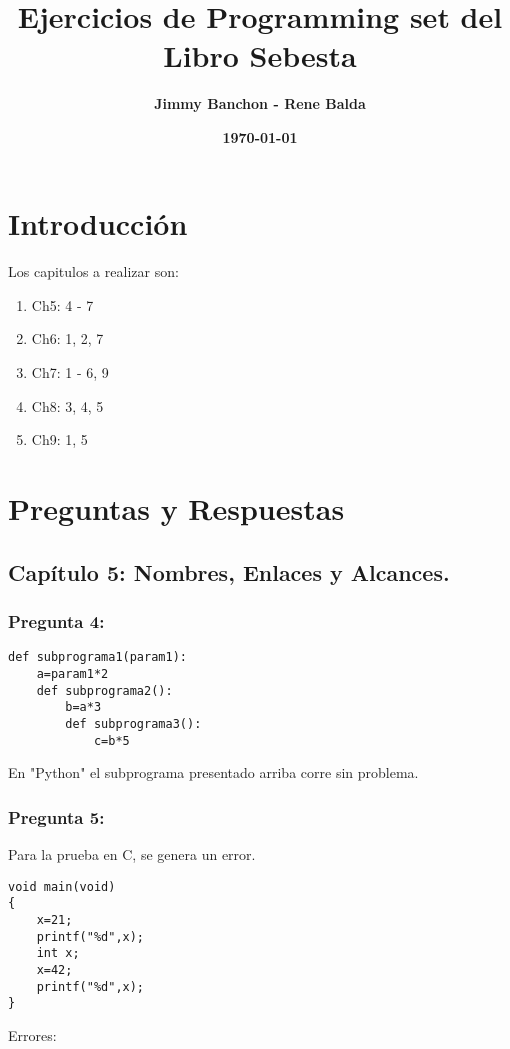 \documentclass[11pt]{article}
\title{\textbf{Ejercicios de Programming set del Libro Sebesta}}
\author{\textbf{Jimmy Banchon - Rene Balda}}
\date{\textbf{\today}}
\begin{document}
\maketitle

\section{Introducción}
\paragraph{} \noindent
Los capitulos a realizar son:
\begin{enumerate}
\item
 Ch5: 4 - 7
\item
 Ch6: 1, 2, 7
\item
 Ch7: 1 - 6, 9
\item
 Ch8: 3, 4, 5
\item
 Ch9: 1, 5
\end{enumerate}

\section{Preguntas y Respuestas}

\subsection{Capítulo 5: Nombres, Enlaces y Alcances.}
\subsubsection{Pregunta 4:}
\begin{lstlisting}[frame=single]
def subprograma1(param1):
	a=param1*2
	def subprograma2():
		b=a*3
		def subprograma3():
			c=b*5

\end{lstlisting}
En "Python" el subprograma presentado arriba corre sin problema.


\subsubsection{Pregunta 5:}
Para la prueba en C, se genera un error.
\begin{lstlisting}[frame=single]
void main(void)
{
	x=21;
	printf("%d",x);
	int x;
	x=42;
	printf("%d",x);
}
\end{lstlisting}

\noindent Errores:
\end{document}
